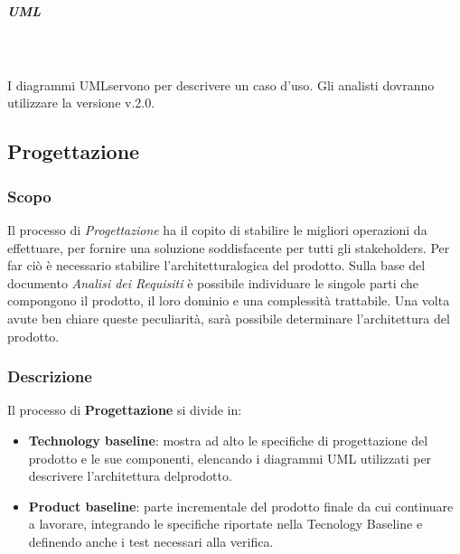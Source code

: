 				\subparagraph*{UML} \mbox{} \\ \mbox{} \\
				I diagrammi UML\glo servono per descrivere un caso d'uso. Gli analisti dovranno utilizzare la versione v.2.0. \newline \newline
	\subsection{Progettazione}
		\subsubsection{Scopo}
		Il processo di \textit{Progettazione} ha il copito di stabilire le migliori operazioni da effettuare, per fornire una soluzione soddisfacente per tutti gli stakeholders\glo. Per far ciò è necessario stabilire l'architettura\glo logica del prodotto. Sulla base del documento \textit{Analisi dei Requisiti} è possibile individuare le singole parti che compongono il prodotto, il loro dominio e una complessità trattabile. Una volta avute ben chiare queste peculiarità, sarà possibile determinare l'architettura del prodotto.
		\subsubsection{Descrizione}
		Il processo di \textbf{Progettazione} si divide in:
			\begin{itemize}
				\item \textbf{Technology baseline}: mostra ad alto le specifiche di progettazione del prodotto e le sue componenti, elencando i diagrammi UML utilizzati per descrivere l'architettura delprodotto.
				\item \textbf{Product baseline}: parte incrementale del prodotto finale da cui continuare a lavorare, integrando le specifiche riportate nella Tecnology Baseline e  definendo anche i test necessari alla verifica.
			\end{itemize} 
